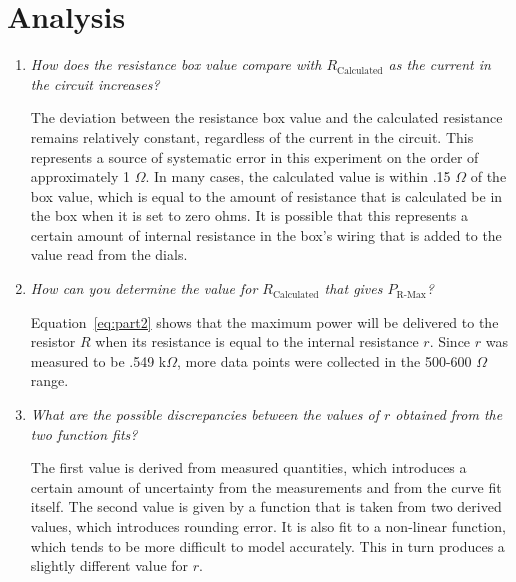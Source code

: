 \documentclass[twocolumn,english]{IEEEtran}
\theoremstyle{plain}
\theoremstyle{plain}
\begin{document}
\section{Analysis}
\begin{enumerate}
 \item
 \textit{How does the resistance box value compare with $R_{\text{Calculated}}$ as the current in the circuit increases?}

  The deviation between the resistance box value and the calculated resistance remains relatively constant, regardless of the current in the circuit. This represents a source of systematic error in this experiment on the order of approximately 1 $\Omega$. In many cases, the calculated value is within .15 $\Omega$ of the box value, which is equal to the amount of resistance that is calculated be in the box when it is set to zero ohms. It is possible that this represents a certain amount of internal resistance in the box's wiring that is added to the value read from the dials.

 \item \textit{How can you determine the value for $R_{\text{Calculated}}$ that gives $P_{\text{R-Max}}$?}

 Equation~\ref{eq:part2} shows that the maximum power will be delivered to the resistor $R$ when its resistance is equal to the internal resistance $r$. Since $r$ was measured to be .549 k$\Omega$, more data points were collected in the 500-600 $\Omega$ range.

 \item \textit{What are the possible discrepancies between the values of $r$ obtained from the two function fits?}

 The first value is derived from measured quantities, which introduces a certain amount of uncertainty from the measurements and from the curve fit itself. The second value is given by a function that is taken from two derived values, which introduces rounding error. It is also fit to a non-linear function, which tends to be more difficult to model accurately. This in turn produces a slightly different value for $r$.

\end{enumerate}


\appendices{}

%
%
\end{document}
